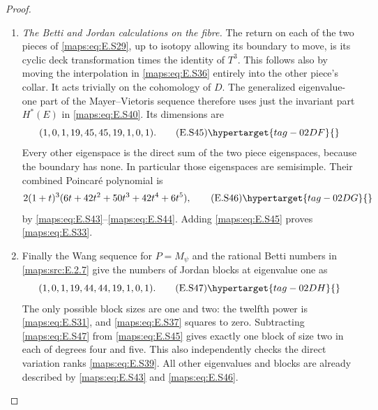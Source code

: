 \begin{proof}
\begin{enumerate}[label={$\langle1\rangle$\arabic*.},leftmargin=*]
\item \emph{The Betti and Jordan calculations on the fibre.}
The return on each of the two pieces of \eqref{maps:eq:E.S29}, up to
isotopy allowing its boundary to move, is its cyclic deck
transformation times the identity of $T^3$. This follows
also by moving the interpolation in \eqref{maps:eq:E.S36} entirely into
the other piece's collar. It acts trivially on the
cohomology of $D$. The generalized eigenvalue-one part of
the Mayer--Vietoris sequence therefore uses just the
invariant part $H^*(E)$ in \eqref{maps:eq:E.S40}. Its dimensions are
\[
       (1,0,1,19,45,45,19,1,0,1).
 \tag{E.S45}\hypertarget{tag-02DF}{}\label{maps:eq:E.S45}
\]
Every other eigenspace is the direct sum of the two piece
eigenspaces, because the boundary has none. In particular
those eigenspaces are semisimple. Their combined Poincar\'e
polynomial is
\[
     2(1+t)^3(6t+42t^2+50t^3+42t^4+6t^5),
 \tag{E.S46}\hypertarget{tag-02DG}{}\label{maps:eq:E.S46}
\]
by \eqref{maps:eq:E.S43}--\eqref{maps:eq:E.S44}. Adding \eqref{maps:eq:E.S45} proves \eqref{maps:eq:E.S33}.

\item Finally the Wang sequence for $P=M_\psi$ and the rational
Betti numbers in \ref{maps:src:E.2.7} give the numbers of Jordan blocks
at eigenvalue one as
\[
          (1,0,1,19,44,44,19,1,0,1).
 \tag{E.S47}\hypertarget{tag-02DH}{}\label{maps:eq:E.S47}
\]
The only possible block sizes are one and two: the
twelfth power is \eqref{maps:eq:E.S31}, and \eqref{maps:eq:E.S37} squares to zero.
Subtracting \eqref{maps:eq:E.S47} from \eqref{maps:eq:E.S45} gives exactly one block
of size two in each of degrees four and five. This also
independently checks the direct variation ranks \eqref{maps:eq:E.S39}.
All other eigenvalues and blocks are already described
by \eqref{maps:eq:E.S43} and \eqref{maps:eq:E.S46}. \end{enumerate}
\end{proof}

